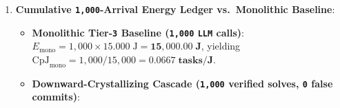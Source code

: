 \documentclass[10pt,letterpaper]{article}
\providecommand{\tightlist}{\setlength{\itemsep}{1pt}\setlength{\parskip}{0pt}}
\begin{document}
\begin{enumerate}
  \begin{itemize}
  \tightlist
  \item
    Distilling a verified Tier-\texttt{3} solution into a reusable
    Tier-\texttt{2} rule costs
    \(E_{\text{synth},3\to 2} = 0.450\;\text{J}\), giving break-even
    repeat count:
    \[N^*_{3\to 2} = \left\lceil \frac{E_{\text{synth},3\to 2}}{c_3 - c_2} \right\rceil = \left\lceil \frac{0.450}{15.000 - 0.015} \right\rceil = \lceil 0.03003 \rceil = \mathbf{1\;\text{repeat arrival}},\]
    paying back its entire synthesis cost on the very next occurrence of
    the class.
  \item
    Freezing a \texttt{3}-times-verified Tier-\texttt{2} rule into a
    \texttt{DNULLMM1} Tier-\texttt{1} slot costs
    \(E_{\text{synth},2\to 1} = 0.045\;\text{J}\), breaking even at
    \(N^*_{2\to 1} = \lceil 0.045 / (0.015 - 0.00000177) \rceil = \mathbf{4\;\text{subsequent hits}}\).
  \item
    Compiling each of the \texttt{4} hot finite-domain classes (after
    \texttt{50} cumulative hits) into a resident \texttt{LUT6} page
    costs \(E_{\text{synth},1\to 0} = 0.250\;\text{J}\)
    (\texttt{1.000\ J} total across \texttt{4} classes).
  \end{itemize}
\item
  \textbf{Cumulative \texttt{1,000}-Arrival Energy Ledger vs.~Monolithic
  Baseline}:

  \begin{itemize}
  \tightlist
  \item
    \textbf{Monolithic Tier-\texttt{3} Baseline (\texttt{1,000}
    \texttt{LLM} calls)}:
    \(E_{\text{mono}} = 1{,}000 \times 15.000\;\text{J} = \mathbf{15{,}000.00\;\text{J}}\),
    yielding
    \(\mathrm{CpJ}_{\text{mono}} = 1{,}000 / 15{,}000 = \mathbf{0.0667\;\text{tasks/J}}\).
  \item
    \textbf{Downward-Crystallizing Cascade (\texttt{1,000} verified
    solves, \texttt{0} false commits)}:


\end{itemize}
\end{enumerate}
\end{document}
